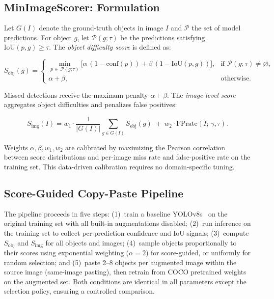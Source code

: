 \documentclass[conference]{IEEEtran}
\begin{document}
\subsection{MinImageScorer: Formulation}

Let $G(I)$ denote the ground-truth objects in image $I$ and
$\mathcal{P}$ the set of model predictions. For object $g$, let
$\mathcal{P}(g;\tau)$ be the predictions satisfying
$\mathrm{IoU}(p,g)\ge\tau$. The \emph{object difficulty score} is
defined as:

\begin{equation}
S_{\mathrm{obj}}(g) =
\begin{cases}
\displaystyle\min_{p\,\in\,\mathcal{P}(g;\tau)}
  \bigl[
    \alpha\,(1 - \mathrm{conf}(p))
    + \beta\,(1 - \mathrm{IoU}(p,g))
  \bigr],
  & \text{if } \mathcal{P}(g;\tau) \neq \varnothing, \\[6pt]
\alpha + \beta,
  & \text{otherwise.}
\end{cases}
\label{eq:obj_score}
\end{equation}

Missed detections receive the maximum penalty $\alpha + \beta$.
The \emph{image-level score} aggregates object difficulties and
penalizes false positives:

\begin{equation}
S_{\mathrm{img}}(I) =
  w_1 \cdot \frac{1}{|G(I)|} \sum_{g \in G(I)} S_{\mathrm{obj}}(g)
  \;+\; w_2 \cdot \mathrm{FPrate}(I;\,\gamma,\tau).
\label{eq:img_score}
\end{equation}

Weights $\alpha,\beta,w_1,w_2$ are calibrated by maximizing the
Pearson correlation between score distributions and per-image miss
rate and false-positive rate on the training set. This data-driven
calibration requires no domain-specific tuning.

\subsection{Score-Guided Copy-Paste Pipeline}

The pipeline proceeds in five steps:
(1)~train a baseline YOLOv8s~\cite{yolov8} on the original training
set with all built-in augmentations disabled;
(2)~run inference on the training set to collect per-prediction
confidence and IoU signals;
(3)~compute $S_{\mathrm{obj}}$ and $S_{\mathrm{img}}$ for all objects
and images;
(4)~sample objects proportionally to their scores using exponential
weighting ($\alpha{=}2$) for score-guided, or uniformly for random
selection; and
(5)~paste 2--8 objects per augmented image within the source image
(same-image pasting), then retrain from COCO pretrained weights on
the augmented set.
Both conditions are identical in all parameters except the selection
policy, ensuring a controlled comparison.
\end{document}
